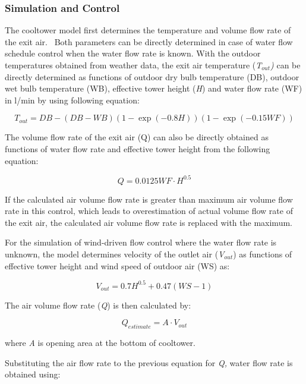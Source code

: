 \subsubsection{Simulation and Control}\label{simulation-and-control-5-000}

The cooltower model first determines the temperature and volume flow rate of the exit air.~ Both parameters can be directly determined in case of water flow schedule control when the water flow rate is known. With the outdoor temperatures obtained from weather data, the exit air temperature (\emph{T\(_{out}\))} can be directly determined as functions of outdoor dry bulb temperature (DB), outdoor wet bulb temperature (WB), effective tower height (\emph{H}) and water flow rate (WF) in l/min by using following equation:

\begin{equation}
{T_{out}} = DB - (DB - WB)(1 - \exp ( - 0.8H))(1 - \exp ( - 0.15WF))
\end{equation}

The volume flow rate of the exit air (Q) can also be directly obtained as functions of water flow rate and effective tower height from the following equation:

\begin{equation}
Q = 0.0125WF \cdot {H^{0.5}}
\end{equation}

If the calculated air volume flow rate is greater than maximum air volume flow rate in this control, which leads to overestimation of actual volume flow rate of the exit air, the calculated air volume flow rate is replaced with the maximum.

For the simulation of wind-driven flow control where the water flow rate is unknown, the model determines velocity of the outlet air (\emph{V\(_{out}\)}) as functions of effective tower height and wind speed of outdoor air (WS) as:

\begin{equation}
{V_{out}} = 0.7{H^{0.5}} + 0.47(WS - 1)
\end{equation}

The air volume flow rate (\emph{Q}) is then calculated by:

\begin{equation}
{Q_{estimate}} = A \cdot {V_{out}}
\end{equation}

where \emph{A} is opening area at the bottom of cooltower.

Substituting the air flow rate to the previous equation for \emph{Q,} water flow rate is obtained using:

